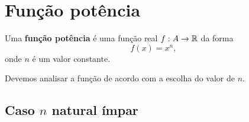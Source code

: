  \section{Função potência}

\begin{obs}
Uma \textbf{função potência} é uma função real $f:A\to\mathbb{R}$ da forma
\begin{equation*}
    f(x)=x^n,
\end{equation*}
onde $n$ é um valor constante.
\end{obs}

Devemos analisar a função de acordo com a escolha do valor de $n$.

\subsection{Caso $n$ natural ímpar}

